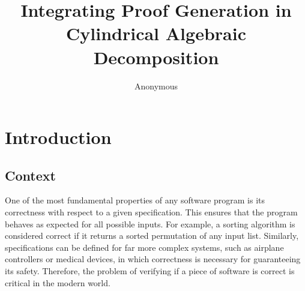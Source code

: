 \documentclass[a4paper, 12pt]{article}
\title{Integrating Proof Generation in Cylindrical Algebraic Decomposition}
\author{Anonymous}
\date{}
\begin{document}
\maketitle

\vspace{-20pt}
\section{Introduction}
\subsection{Context}


\qquad One of the most fundamental properties of any software program is its correctness with respect
to a given specification. This ensures that the program behaves as expected for all possible inputs.
For example, a sorting algorithm is considered correct if it returns a sorted permutation of any input
list. Similarly, specifications can be defined for far more complex systems, such as airplane
controllers or medical devices, in which correctness is necessary for guaranteeing its safety.
Therefore, the problem of verifying if a piece of software is correct is critical in the modern world.


\end{document}
